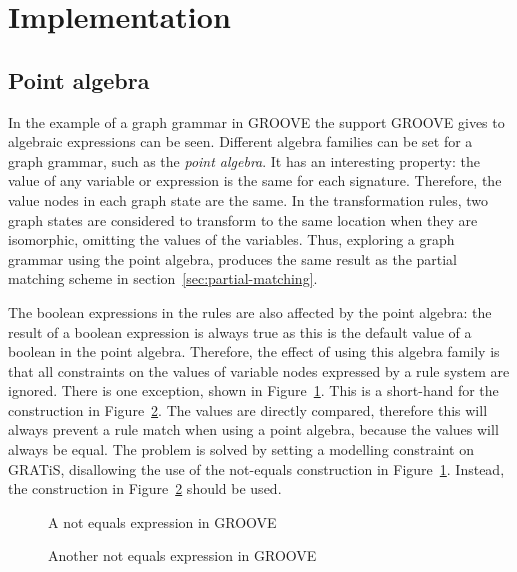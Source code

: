 \section{Implementation}\label{sec:implementation}

\subsection{Point algebra}
In the example of a graph grammar in GROOVE the support GROOVE gives to algebraic expressions can be seen. Different algebra families can be set for a graph grammar, such as the \textit{point algebra}. It has an interesting property: the value of any variable or expression is the same for each signature. Therefore, the value nodes in each graph state are the same. In the transformation rules, two graph states are considered to transform to the same location when they are isomorphic, omitting the values of the variables. Thus, exploring a graph grammar using the point algebra, produces the same result as the partial matching scheme in section~\ref{sec:partial-matching}. 

The boolean expressions in the rules are also affected by the point algebra: the result of a boolean expression is always true as this is the default value of a boolean in the point algebra. Therefore, the effect of using this algebra family is that all constraints on the values of variable nodes expressed by a rule system are ignored. There is one exception, shown in Figure~\ref{fig:not_equals_wrong}. This is a short-hand for the construction in Figure~\ref{fig:not_equals_right}. The values are directly compared, therefore this will always prevent a rule match when using a point algebra, because the values will always be equal. The problem is solved by setting a modelling constraint on GRATiS, disallowing the use of the not-equals construction in Figure~\ref{fig:not_equals_wrong}. Instead, the construction in Figure~\ref{fig:not_equals_right} should be used.

\begin{figure}[ht]
  \begin{center}
    
  \end{center}
  \caption{A not equals expression in GROOVE}
  \label{fig:not_equals_wrong}
\end{figure}

\begin{figure}[ht]
  \begin{center}
    
  \end{center}
  \caption{Another not equals expression in GROOVE}
  \label{fig:not_equals_right}
\end{figure}

